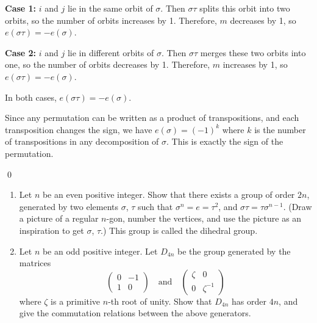 \textbf{Case 1:} $i$ and $j$ lie in the same orbit of $\sigma$. Then $\sigma\tau$ splits this orbit into two orbits, so the number of orbits increases by 1. Therefore, $m$ decreases by 1, so $e(\sigma\tau) = -e(\sigma)$.

\textbf{Case 2:} $i$ and $j$ lie in different orbits of $\sigma$. Then $\sigma\tau$ merges these two orbits into one, so the number of orbits decreases by 1. Therefore, $m$ increases by 1, so $e(\sigma\tau) = -e(\sigma)$.

In both cases, $e(\sigma\tau) = -e(\sigma)$.

Since any permutation can be written as a product of transpositions, and each transposition changes the sign, we have $e(\sigma) = (-1)^k$ where $k$ is the number of transpositions in any decomposition of $\sigma$. This is exactly the sign of the permutation.


\qed
\begin{problembox}
\begin{enumerate}[label=(\alph*)]
\item Let $n$ be an even positive integer. Show that there exists a group of order $2n$, generated by two elements $\sigma$, $\tau$ such that $\sigma^n = e = \tau^2$, and $\sigma\tau = \tau\sigma^{n-1}$. (Draw a picture of a regular $n$-gon, number the vertices, and use the picture as an inspiration to get $\sigma$, $\tau$.) This group is called the dihedral group.
\item Let $n$ be an odd positive integer. Let $D_{4n}$ be the group generated by the matrices
\[\begin{pmatrix}
0 & -1 \\
1 & 0 
\end{pmatrix} \quad \text{and} \quad \begin{pmatrix}
\zeta & 0 \\
0 & \zeta^{-1}
\end{pmatrix}\]
where $\zeta$ is a primitive $n$-th root of unity. Show that $D_{4n}$ has order $4n$, and give the commutation relations between the above generators.
\end{enumerate}
\end{problembox}

